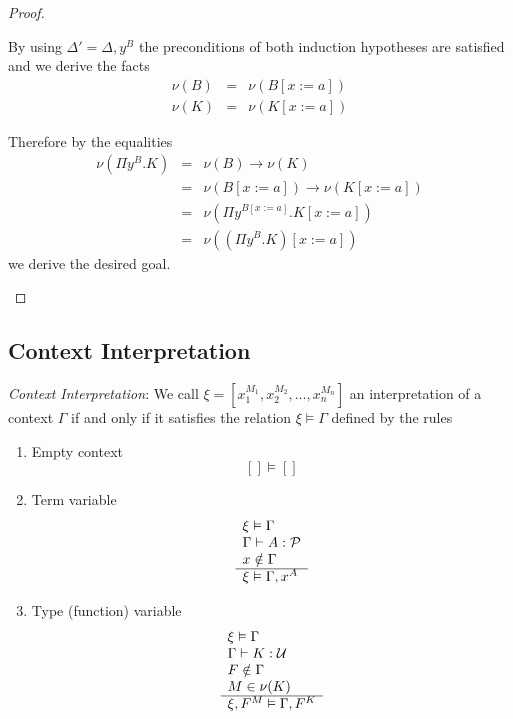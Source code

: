 \begin{theorem}
\begin{proof}
\begin{enumerate}
            By using $\Delta' = \Delta,y^B$ the preconditions of both induction
            hypotheses are satisfied and we derive the facts
            $$
            \begin{array}{lll}
                \nu(B) &=& \nu(B[x:=a])
                \\
                \nu(K) &=& \nu(K[x:=a])
            \end{array}
            $$

            Therefore by the equalities
            $$
            \begin{array}{lll}
                \nu(\Pi y^B.K)
                &=& \nu(B) \to \nu(K)
                \\
                &=& \nu(B[x:=a]) \to \nu(K[x:=a])
                \\
                &=& \nu(\Pi y^{B[x:=a]}. K[x:=a])
                \\
                &=& \nu((\Pi y^B . K)[x:=a])
            \end{array}
            $$
            we derive the desired goal.
        \end{enumerate}
    \end{proof}
\end{theorem}





\subsection{Context Interpretation}

\begin{definition}
    \emph{Context Interpretation}:
    We call $\xi = [x_1^{M_1}, x_2^{M_2}, \ldots, x_n^{M_n}]$ an interpretation
    of a context $\Gamma$ if and only if it satisfies the relation $\xi \vDash
    \Gamma$ defined by the rules
    \begin{enumerate}
    \item Empty context
        $$
        [] \vDash []
        $$
    \item Term variable
        $$
        \begin{array}{l} 
            \xi \vDash \Gamma
            \\
            \Gamma \vdash A : {\cal P}
            \\
            x \notin \Gamma
         \\ \hline 
            \xi \vDash \Gamma,x^A
        \end{array}
        $$
    \item Type (function) variable
        $$
        \begin{array}{l} 
            \xi \vDash \Gamma
            \\
            \Gamma \vdash K: {\cal U}
            \\
            F \notin \Gamma
            \\
            M \in \nu(K)
         \\ \hline 
            \xi,F^M \vDash \Gamma,F^K
        \end{array}
        $$
    \end{enumerate}
\end{definition}







